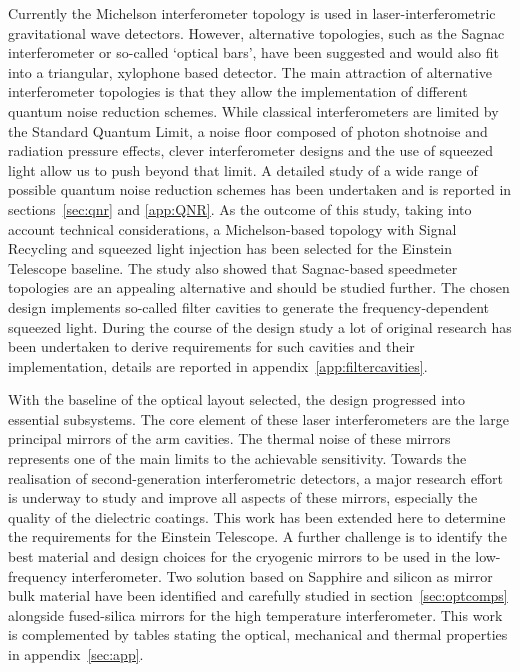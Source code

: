 Currently the Michelson interferometer topology is used in
laser-interferometric gravitational wave detectors. However,
alternative topologies, such as the Sagnac interferometer or so-called
`optical bars',  have been suggested and would also fit into a triangular, xylophone based detector. The main
attraction of alternative interferometer topologies is that
they allow the implementation of different quantum noise reduction
schemes. While classical interferometers are limited by the Standard
Quantum Limit, a noise floor composed of photon shotnoise and
radiation pressure effects, clever interferometer designs and the use
of squeezed light allow us to push beyond that limit. A detailed study 
of a wide range of possible quantum noise reduction schemes has
been undertaken and is reported in sections~\ref{sec:qnr} and
\ref{app:QNR}.
As the outcome of this study, taking into account technical considerations, a 
Michelson-based topology with Signal Recycling and squeezed light
injection has been selected for the Einstein Telescope baseline.
The study also showed that Sagnac-based speedmeter topologies are an appealing 
alternative and should be studied further.
The chosen design implements so-called filter cavities to generate the
frequency-dependent squeezed light. During the course of the design
study a lot of original research has been undertaken to derive
requirements for such cavities and their implementation, details
are reported in appendix~\ref{app:filtercavities}.

With the baseline of the optical layout selected, the design progressed
into essential subsystems. The core element of these laser
interferometers are the large principal mirrors of the arm
cavities. The
thermal noise of these mirrors represents one of the main limits to
the achievable sensitivity. Towards the realisation of
second-generation interferometric detectors, a major research effort
is underway to study and improve all aspects of these mirrors,
especially the quality of the dielectric coatings. This work has been
extended here to determine the requirements for the Einstein
Telescope. A further challenge is to identify the best material and
design choices for the cryogenic mirrors to be used in the
low-frequency interferometer. Two solution based on Sapphire and
silicon as mirror bulk material have been
identified and carefully studied in section~\ref{sec:optcomps} alongside
fused-silica mirrors for the high temperature interferometer. This
work is complemented by tables stating the optical, mechanical and thermal 
properties in appendix~\ref{sec:app}.

